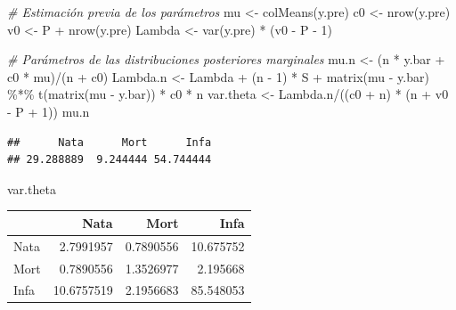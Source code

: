 \documentclass[
  10pt,
  spanish,
]{book}
\newenvironment{Shaded}{\begin{snugshade}}{\end{snugshade}}
\newcommand{\CommentTok}[1]{\textcolor[rgb]{0.56,0.35,0.01}{\textit{#1}}}
\newcommand{\DecValTok}[1]{\textcolor[rgb]{0.00,0.00,0.81}{#1}}
\newcommand{\FunctionTok}[1]{\textcolor[rgb]{0.00,0.00,0.00}{#1}}
\newcommand{\NormalTok}[1]{#1}
\newcommand{\OtherTok}[1]{\textcolor[rgb]{0.56,0.35,0.01}{#1}}
\newcommand{\SpecialCharTok}[1]{\textcolor[rgb]{0.00,0.00,0.00}{#1}}
\theoremstyle{definition}
\theoremstyle{definition}
\theoremstyle{definition}
\theoremstyle{definition}
\theoremstyle{remark}
\begin{document}
\begin{Shaded}
\begin{Highlighting}[]
\CommentTok{\# Estimación previa de los parámetros}
\NormalTok{mu }\OtherTok{\textless{}{-}} \FunctionTok{colMeans}\NormalTok{(y.pre)}
\NormalTok{c0 }\OtherTok{\textless{}{-}} \FunctionTok{nrow}\NormalTok{(y.pre)}
\NormalTok{v0 }\OtherTok{\textless{}{-}}\NormalTok{ P }\SpecialCharTok{+} \FunctionTok{nrow}\NormalTok{(y.pre)}
\NormalTok{Lambda }\OtherTok{\textless{}{-}} \FunctionTok{var}\NormalTok{(y.pre) }\SpecialCharTok{*}\NormalTok{ (v0 }\SpecialCharTok{{-}}\NormalTok{ P }\SpecialCharTok{{-}} \DecValTok{1}\NormalTok{)}

\CommentTok{\# Parámetros de las distribuciones posteriores marginales}
\NormalTok{mu.n }\OtherTok{\textless{}{-}}\NormalTok{ (n }\SpecialCharTok{*}\NormalTok{ y.bar }\SpecialCharTok{+}\NormalTok{ c0 }\SpecialCharTok{*}\NormalTok{ mu)}\SpecialCharTok{/}\NormalTok{(n }\SpecialCharTok{+}\NormalTok{ c0)}
\NormalTok{Lambda.n }\OtherTok{\textless{}{-}}\NormalTok{ Lambda }\SpecialCharTok{+}\NormalTok{ (n }\SpecialCharTok{{-}} \DecValTok{1}\NormalTok{) }\SpecialCharTok{*}\NormalTok{ S }\SpecialCharTok{+} 
  \FunctionTok{matrix}\NormalTok{(mu }\SpecialCharTok{{-}}\NormalTok{ y.bar) }\SpecialCharTok{\%*\%} 
  \FunctionTok{t}\NormalTok{(}\FunctionTok{matrix}\NormalTok{(mu }\SpecialCharTok{{-}}\NormalTok{ y.bar)) }\SpecialCharTok{*}\NormalTok{ c0 }\SpecialCharTok{*}\NormalTok{ n}
\NormalTok{var.theta }\OtherTok{\textless{}{-}}\NormalTok{ Lambda.n}\SpecialCharTok{/}\NormalTok{((c0 }\SpecialCharTok{+}\NormalTok{ n) }\SpecialCharTok{*}\NormalTok{ (n }\SpecialCharTok{+}\NormalTok{ v0 }\SpecialCharTok{{-}}\NormalTok{ P }\SpecialCharTok{+} \DecValTok{1}\NormalTok{))}
\NormalTok{mu.n}
\end{Highlighting}
\end{Shaded}

\begin{verbatim}
##      Nata      Mort      Infa 
## 29.288889  9.244444 54.744444
\end{verbatim}

\begin{Shaded}
\begin{Highlighting}[]
\NormalTok{var.theta}
\end{Highlighting}
\end{Shaded}

\begin{tabular}{l|r|r|r}
\hline
  & Nata & Mort & Infa\\
\hline
Nata & 2.7991957 & 0.7890556 & 10.675752\\
\hline
Mort & 0.7890556 & 1.3526977 & 2.195668\\
\hline
Infa & 10.6757519 & 2.1956683 & 85.548053\\
\hline
\end{tabular}
\end{document}
